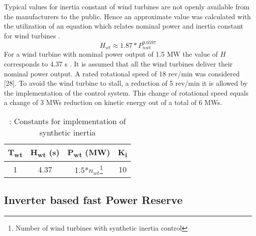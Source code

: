 

Typical values for inertia constant of wind turbines are not openly available from the manufacturers to the public. Hence an approximate value was calculated with the utilization of an equation which relates nominal power and inertia constant for wind turbines \cite{GonzalezRodriguez.2007}.
\begin{equation}
	\label{eq:wtinertia}
	H_{wt}\approx1.87*P_{nwt}^{0.0597}
\end{equation}
For a wind turbine with nominal power output of 1.5 MW the value of $ H $ corresponds to 4.37 s \cite{Wu.2013}.
It is assumed that all the wind turbines deliver their nominal power output. A rated rotational speed of 18 rev/min was considered [28]. To avoid the wind turbine to stall, a reduction of 5 rev/min it is allowed by the implementation of the control system. This change of rotational speed equals a change of 3 MWs reduction on kinetic energy out of a total of 6 MWs.

\begin{table}[h]
	\caption{\label{tb:inertia}: Constants for implementation of synthetic inertia}
	\centering
	\begin{tabular}{cccc}
		\toprule
		\textbf{T\textsubscript{wt}} 	& \textbf{ H\textsubscript{wt} (s)}	& \textbf{ P\textsubscript{wt} (MW)}  & \textbf{ K\textsubscript{i}} \\
		\midrule
			1	       & 4.37		        &  1.5*$ n_{wt} $\footnote{Number of wind turbines with synthetic inertia control} & 10 \\
		\bottomrule
	\end{tabular}
\end{table}

\subsection{Inverter based fast Power Reserve}


